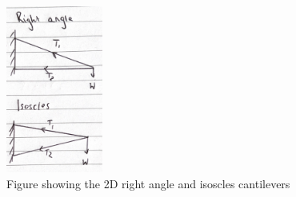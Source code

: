 \documentclass[12pt]{article}
\begin{document}
                \begin{figure}[H]
                    \begin{center}
                    \captionsetup{labelfont=bf}
                    \captionsetup{justification=centering}
                    \includegraphics[height=13pc]{init_design.png}
                    \caption{Figure showing the 2D right angle and isoscles cantilevers}
                    \end{center}
                \end{figure}
\end{document}
